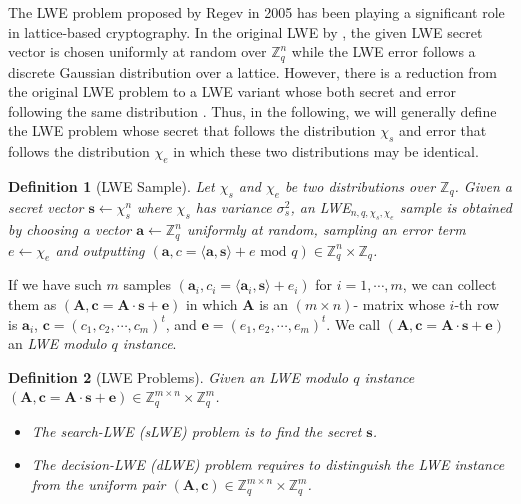 \documentclass{cta-author}
\newtheorem{definition}{Definition}{}
\begin{document}
The LWE problem proposed by Regev in 2005 \cite{Reg09} has been playing a significant role in lattice-based cryptography. In the original LWE by \cite{Reg09}, the given LWE secret vector  is chosen uniformly at random over $\mathbb{Z}_q^n$ while the LWE error follows a discrete Gaussian distribution over a lattice. However, there is a reduction from the original LWE problem to a LWE variant whose both secret and error following the same distribution \cite{ACPS09}. Thus, in the following, we will generally define the LWE problem whose secret that follows the distribution $\chi_s$  and  error that follows the distribution $\chi_e$ in which these two distributions may be identical.
\begin{definition}[LWE Sample]
	Let $\chi_s$ and $\chi_e$ be two distributions over $\mathbb{Z}_q$. Given a secret vector $\mathbf{s} \leftarrow \chi_s^n$ where $\chi_s$ has variance $\sigma^2_s$, an LWE$_{n,q, \chi_s, \chi_e}$ sample is obtained by choosing a vector $\mathbf{a} \leftarrow \mathbb{Z}_q^n$ uniformly at random, sampling an error term $e\leftarrow \chi_e$ and outputting $(\mathbf{a},c=\langle \mathbf{a}, \mathbf{s}\rangle +e \text{ mod } q) \in  \mathbb{Z}_q^n \times  \mathbb{Z}_q$.
\end{definition}

If we have such $m$ samples $(\mathbf{a}_i,c_i=\langle \mathbf{a}_i, \mathbf{s}\rangle +e_i)$ for $i=1,\cdots,m$, we can collect them as  $(\mathbf{A},\mathbf{c}=\mathbf{A} \cdot \mathbf{s}+\mathbf{e})$ in which $\mathbf{A}$ is an $(m \times n)$- matrix whose $i$-th row is $\mathbf{a}_i$, $\mathbf{c}=(c_1,c_2,\cdots,c_m)^t$, and $\mathbf{e}=(e_1,e_2,\cdots,e_m)^t$. We call $(\mathbf{A},\mathbf{c}=\mathbf{A} \cdot \mathbf{s}+\mathbf{e})$ an\textit{ \textit{LWE modulo $q$ instance}}.

\begin{definition}[LWE Problems]
	Given an LWE modulo $q$ instance $(\mathbf{A},\mathbf{c}=\mathbf{A} \cdot \mathbf{s}+\mathbf{e}) \in  \mathbb{Z}_q^{m\times n} \times  \mathbb{Z}_q^{m}$.
	\begin{itemize}
		\item The search-LWE (sLWE) problem is to find the secret $\mathbf{s}$.
		\item The decision-LWE (dLWE) problem requires to distinguish the LWE instance  from the uniform pair $(\mathbf{A},\mathbf{c}) \in  \mathbb{Z}_q^{m\times n} \times  \mathbb{Z}_q^{m}$.
	\end{itemize}
\end{definition}
\end{document}
